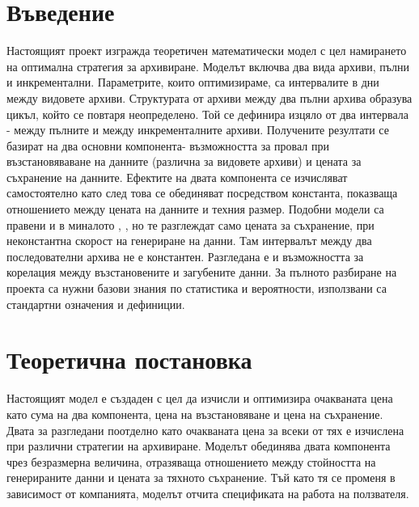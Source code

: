 \documentclass[11pt, a4paper]{article}
\theoremstyle{definition}
\begin{document}
\section{Въведение}
		Настоящият проект изгражда теоретичен математически модел с цел намирането на оптимална стратегия за архивиране. Моделът включва два вида архиви, пълни и инкрементални. Параметрите, които оптимизираме, са интервалите в дни между видовете архиви. Структурата от архиви между два пълни архива образува цикъл, който се повтаря неопределено. Той се дефинира изцяло от два интервала - между пълните и между инкременталните архиви. Получените резултати се базират на два основни компонента- възможността за провал при възстановяваване на данните (различна за видовете архиви) и цената за съхранение на данните. Ефектите на двата компонента се изчисляват самостоятелно като след това се обединяват посредством константа, показваща отношението между цената на данните и техния размер. Подобни модели са правени и в миналото \cite{qian2010optimal}, \cite{nakamura2003optimal}, но те разглеждат само цената за съхранение, при неконстантна скорост на генериране на данни. Там интервалът между два последователни архива не е константен. Разгледана е и възможността за корелация между възстановените и загубените данни. За пълното разбиране на проекта са нужни базови знания по статистика и вероятности, използвани са стандартни означения и дефиниции.\newpage

\section{Теоретична постановка}
	Настоящият модел е създаден с цел да изчисли и оптимизира очакваната цена като сума на два компонента, цена на възстановяване и цена на съхранение. Двата за разгледани поотделно като очакваната цена за всеки от тях е изчислена при различни стратегии на архивиране. Моделът обединява двата компонента чрез безразмерна величина, отразяваща отношението между стойността на генерираните данни и цената за тяхното съхранение. Тъй като тя се променя в зависимост от компанията, моделът отчита спецификата на работа на ползвателя.
\end{document}
